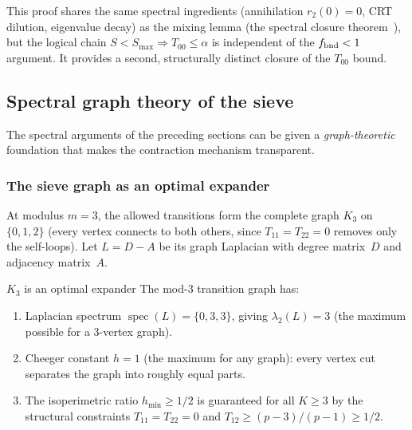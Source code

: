 \documentclass[12pt,a4paper]{article}
\begin{document}
\begin{remark}
This proof shares the same spectral ingredients (annihilation
$r_2(0) = 0$, CRT dilution, eigenvalue decay) as the mixing lemma
(the spectral closure theorem~\cite{companion_M3}), but the logical chain
$S < S_{\max} \Rightarrow T_{00} \leq \alpha$ is independent of the
$f_{\rm bnd} < 1$ argument. It provides a second, structurally
distinct closure of the $T_{00}$ bound.
\end{remark}

\subsection{Spectral graph theory of the sieve}
\label{sec:ch7b_spectral_graph}

The spectral arguments of the preceding sections can be given a
\emph{graph-theoretic} foundation that makes the contraction
mechanism transparent.

\subsubsection{The sieve graph as an optimal expander}

At modulus $m = 3$, the allowed transitions form the complete
graph $K_3$ on $\{0,1,2\}$ (every vertex connects to both others,
since $T_{11} = T_{22} = 0$ removes only the self-loops).
Let $L = D - A$ be its graph Laplacian
with degree matrix~$D$ and adjacency matrix~$A$.

\begin{thmbox}{$K_3$ is an optimal expander}
\label{thm:expander_ext}
The mod-3 transition graph has:
\begin{enumerate}[nosep]
\item Laplacian spectrum $\operatorname{spec}(L) = \{0, 3, 3\}$,
  giving $\lambda_2(L) = 3$ (the maximum possible for a 3-vertex graph).
\item Cheeger constant $h = 1$ (the maximum for any graph):
  every vertex cut separates the graph into roughly equal parts.
\item The isoperimetric ratio $h_{\min} \geq 1/2$ is guaranteed
  for all $K \geq 3$ by the structural constraints $T_{11} = T_{22} = 0$
  and $T_{12} \geq (p-3)/(p-1) \geq 1/2$.
\end{enumerate}
\end{thmbox}
\end{document}
